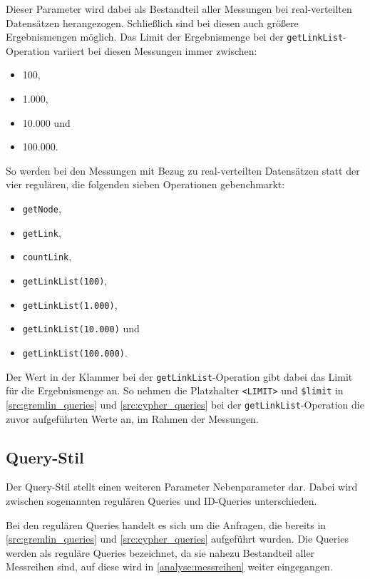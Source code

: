 Dieser Parameter wird dabei als Bestandteil aller Messungen bei real-verteilten Datensätzen herangezogen. Schließlich sind bei diesen auch größere Ergebnismengen möglich. Das Limit der Ergebnismenge bei der \texttt{getLinkList}-Operation variiert bei diesen Messungen immer zwischen: 
\begin{itemize}
    \item 100,
    \item 1.000,
    \item 10.000 und
    \item 100.000.
\end{itemize}

So werden bei den Messungen mit Bezug zu real-verteilten Datensätzen statt der vier regulären, die folgenden sieben Operationen gebenchmarkt:
\begin{itemize}
    \item \texttt{getNode},
    \item \texttt{getLink},
    \item \texttt{countLink},
    \item \texttt{getLinkList(100)},
    \item \texttt{getLinkList(1.000)},
    \item \texttt{getLinkList(10.000)} und
    \item \texttt{getLinkList(100.000)}.
\end{itemize}

Der Wert in der Klammer bei der \texttt{getLinkList}-Operation gibt dabei das Limit für die Ergebnismenge an. So nehmen die Platzhalter \texttt{<LIMIT>} und \texttt{\$limit}
in \autoref{src:gremlin_queries} und \autoref{src:cypher_queries} bei der \texttt{getLinkList}-Operation die zuvor aufgeführten Werte an, im Rahmen der Messungen.

\subsection{Query-Stil}
Der Query-Stil stellt einen weiteren Parameter Nebenparameter dar. Dabei wird zwischen sogenannten regulären Queries und ID-Queries unterschieden. 

Bei den regulären Queries handelt es sich um die Anfragen, die bereits in \autoref{src:gremlin_queries} und \autoref{src:cypher_queries} aufgeführt wurden. Die Queries werden als reguläre Queries bezeichnet, da sie nahezu Bestandteil aller Messreihen sind, auf diese wird in \autoref{analyse:messreihen} weiter eingegangen. 

